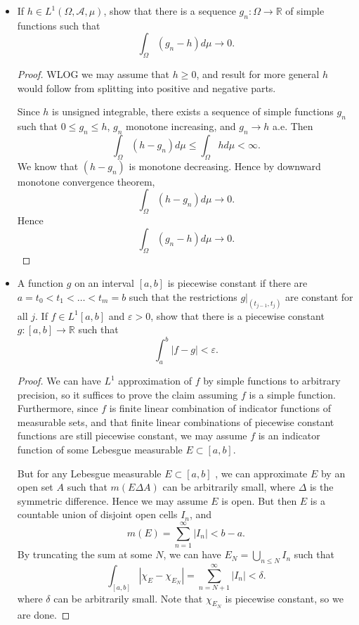
\begin{itemize}
	\item If $h \in L^1(\Omega, \mathcal{A}, \mu)$, show that there is a sequence $g_n : \Omega \to \mathbb{R}$ of simple functions such that
		\[
			\int _\Omega (g_n - h) d \mu \to  0
		.\] 
\begin{proof}
	WLOG we may assume that $h \ge 0$, and result for more general $h$ would follow from splitting into positive and negative parts.

	Since $h$ is unsigned integrable, there exists a sequence of simple functions $g_n$ such that $0\le g_n \le h$, $g_n$ monotone increasing, and $g_n \to h$ a.e. Then 
	\[
		\int _\Omega (h - g_n) d \mu \le \int _\Omega h d \mu < \infty
	.\] 
	We know that $(h - g_n)$ is monotone decreasing. Hence by downward monotone convergence theorem,
	\[
		\int _\Omega(h - g_n) d \mu \to 0
	.\] 
	Hence
	\[
		\int _\Omega(g_n - h) d \mu \to  0
	.\] 
\end{proof}

	\item A function $g$ on an interval $[a,b]$ is piecewise constant if there are $a = t_0 < t_1 < \ldots < t_m = b$ such that the restrictions $g|_{(t_{j-1}, t_j)}$ are constant for all $j$. If $f \in L^1[a,b]$ and $\varepsilon>0$, show that there is a piecewise constant $g: [a,b] \to  \mathbb{R}$ such that 
		\[
			\int _a^b |f-g| < \varepsilon
		.\] 
\begin{proof}
	We can have $L^1$ approximation of $f$ by simple functions to arbitrary precision, so it suffices to prove the claim assuming  $f$ is a simple function. Furthermore, since $f$ is finite linear combination of indicator functions of measurable sets, and that finite linear combinations of piecewise constant functions are still piecewise constant, we may assume $f$ is an indicator function of some Lebesgue measurable $E \subset [a,b]$.

	But for any Lebesgue measurable $E \subset [a,b]$ , we can approximate $E$ by an open set $A$ such that $m(E \Delta A)$ can be arbitrarily small, where $\Delta$ is the symmetric difference. Hence we may assume $E$ is open. But then $E$ is a countable union of disjoint open cells $I_n$, and
	 \[
		m(E) = \sum_{n=1}^{\infty} |I_n| < b-a
	.\] 
	By truncating the sum at some $N$, we can have $E_N = \bigcup_{n \le N} I_n$ such that
	\[
		\int_{[a,b]} |\chi_{E} - \chi_{E_N}| = \sum_{n = N+1}^{\infty }|I_n| < \delta
	.\] 
	where $\delta$ can be arbitrarily small. Note that $\chi_{E_N}$ is piecewise constant, so we are done.
\end{proof}


\end{itemize}
